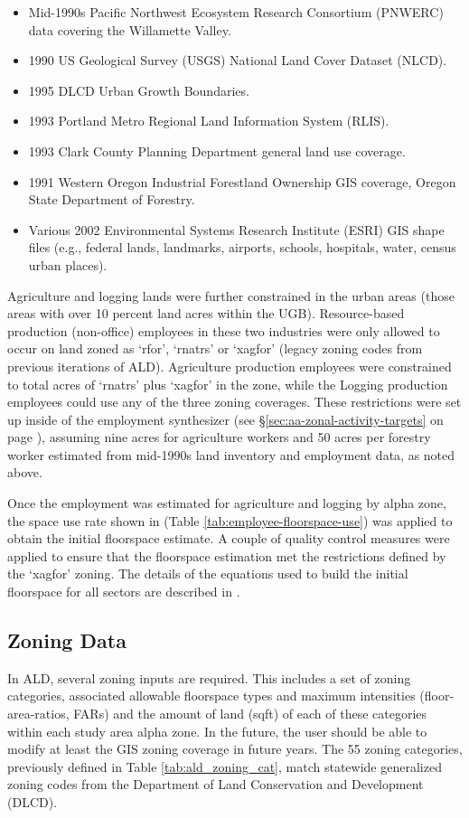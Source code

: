 \begin{itemize}
\item Mid-1990s Pacific Northwest Ecosystem Research Consortium (PNWERC) data covering the Willamette Valley.
\item 1990 US Geological Survey (USGS) National Land Cover Dataset (NLCD).
\item 1995 DLCD Urban Growth Boundaries.
\item 1993 Portland Metro Regional Land Information System (RLIS).
\item 1993 Clark County Planning Department general land use coverage.
\item 1991 Western Oregon Industrial Forestland Ownership GIS coverage, Oregon State Department of Forestry.
\item Various 2002 Environmental Systems Research Institute (ESRI) GIS shape files (e.g., federal lands, landmarks, airports, schools, hospitals, water, census urban places).
\end{itemize}

Agriculture and logging lands were further constrained in the urban areas (those areas with over 10 percent land acres within the UGB). Resource-based production (non-office) employees in these two industries were only allowed to occur on land zoned as `rfor', `rnatrs' or `xagfor' (legacy zoning codes from previous iterations of ALD). Agriculture production employees were constrained to total acres of `rnatrs' plus `xagfor' in the zone, while the Logging production employees could use any of the three zoning coverages. These restrictions were set up inside of the employment synthesizer (see \S\ref{sec:aa-zonal-activity-targets} on page \pageref{sec:aa-zonal-activity-targets}), assuming nine acres for agriculture workers and 50 acres per forestry worker estimated from mid-1990s land inventory and employment data, as noted above. 

Once the employment was estimated for agriculture and logging by alpha zone, the space use rate shown in (Table \ref{tab:employee-floorspace-use}) was applied to obtain the initial floorspace estimate. A couple of quality control measures were applied to ensure that the floorspace estimation met the restrictions defined by the `xagfor' zoning. The details of the equations used to build the initial floorspace for all sectors are described in \citep{hbaspecto12}. 

\subsection{Zoning Data}\label{sec:ald-zoning-data}
In ALD, several zoning inputs are required. This includes a set of zoning categories, associated allowable floorspace types and maximum intensities (floor-area-ratios, FARs) and the amount of land (sqft) of each of these categories within each study area alpha zone. In the future, the user should be able to modify at least the GIS zoning coverage in future years. The 55 zoning categories, previously defined in Table \ref{tab:ald_zoning_cat}, match statewide generalized zoning codes from the Department of Land Conservation and Development (DLCD). 

